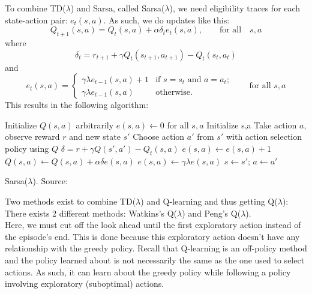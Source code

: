 \documentclass[a4paper]{article}
\begin{document}
To combine TD($\lambda$) and Sarsa, called Sarsa($\lambda$), we need eligibility traces for each state-action pair: $e_t(s,a)$. As such, we do updates like this:
\begin{equation}
Q_{t+1}(s,a) = Q_t(s,a) + \alpha \delta_t e_t(s,a), \qquad \text{for all} \quad s,a
\end{equation}
where
\begin{equation}
\delta_t = r_{t+1} + \gamma Q_t(s_{t+1},a_{t+1}) - Q_t(s_t,a_t)
\end{equation}
and
\begin{equation}
e_t(s,a) = \begin{cases}
	\gamma \lambda e_{t-1}(s,a) + 1 & \text{if $s=s_t$ and $a=a_t$;} \\
	\gamma \lambda e_{t-1}(s,a) & \text{otherwise}.
\end{cases}
\qquad \text{for all $s,a$}
\end{equation}
This results in the following algorithm:\\
\begin{algorithm}[H]
\DontPrintSemicolon
Initialize $Q(s,a)$ arbitrarily\;
$e(s,a) \gets 0$ for all $s,a$\;
 {
	Initialize s,a\;
	 {
    	Take action $a$, observe reward $r$ and new state $s'$\;
        Choose action $a'$ from $s'$ with action selection policy using $Q$\;
        $\delta = r + \gamma Q(s',a') - Q_t(s,a)$\;
        $e(s,a) \gets e(s,a) + 1$\;
         {
        	$Q(s,a) \gets Q(s,a) + \alpha \delta e(s,a)$\;
            $e(s,a) \gets \gamma \lambda e(s,a)$\;
        }
        $s \gets s'$; $a \gets a'$\;
    }
}
\caption{Sarsa($\lambda$). Source: \cite{Sutton1998ReinforcementIntroduction}}
\end{algorithm}
Two methods exist to combine TD($\lambda$) and Q-learning and thus getting Q($\lambda$): There exists 2 different methods: Watkins's Q($\lambda$) and Peng's Q($\lambda$).\\
Here, we must cut off the look ahead until the first exploratory action instead of the episode's end. This is done because this exploratory action doesn't have any relationship with the greedy policy. Recall that Q-learning is an off-policy method and the policy learned about is not necessarily the same as the one used to select actions. As such, it can learn about the greedy policy while following a policy involving exploratory (suboptimal) actions.
\end{document}
